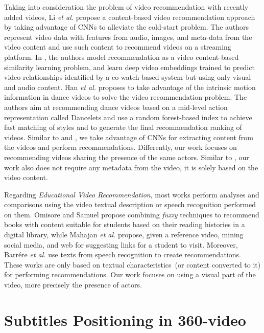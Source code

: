 Taking into consideration the problem of video recommendation with recently added videos, Li \emph{et al.} \cite{li2017study} propose a content-based video recommendation approach by taking advantage of CNNs to alleviate the cold-start problem. The authors represent video data with features from audio, images, and meta-data from the video content and use such content to recommend videos on a streaming platform. In \cite{lee2017large}, the authors model recommendation as a video content-based similarity learning problem, and learn deep video embeddings trained to predict video relationships identified by a co-watch-based system but using only visual and audio content. Han \emph{et al.} \cite{han2016dancelets} proposes to take advantage of the intrinsic motion information in dance videos to solve the video recommendation problem. The authors aim at recommending dance videos based on a mid-level action representation called Dancelets and use a random forest-based index to achieve fast matching of styles and to generate the final recommendation ranking of videos. Similar to \cite{li2017study} and \cite{lee2017large}, we take advantage of CNNs for extracting content from the videos and perform recommendations. Differently, our work focuses on recommending videos sharing the presence of the same actors. Similar to \cite{han2016dancelets}, our work also does not require any metadata from the video, it is solely based on the video content.

Regarding \textit{Educational Video Recommendation}, most works perform analyses and comparisons using the video textual description or speech recognition performed on them. Omisore and Samuel \cite{omisore2014personalized} propose combining \textit{fuzzy} techniques to recommend books with content suitable for students based on their reading histories in a digital library, while Mahajan \emph{et al.} \cite{mahajan2015optimising} propose, given a reference video,  mining social media, and web for suggesting links for a student to visit.
Moreover, Barrére \emph{et al.} \cite{barrere2020utilizaccao} use texts from speech recognition to create recommendations.
These works are only based on textual characteristics~(or content converted to it) for performing recommendations.
Our work focuses on using a visual part of the video, more precisely the presence of actors.


\section{Subtitles Positioning in 360-video}
\label{sec:subtitles}

